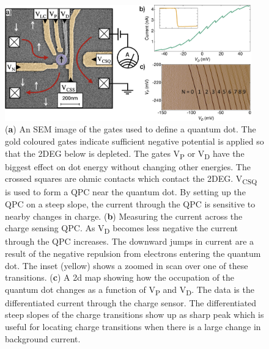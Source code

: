 \begin{figure}[!htb]
  \begin{center}
    \includegraphics[width=0.95\textwidth]{figures/ch1/crop_FiguresMaster.006.png}
    \caption[Charge sensing a quantum dot]{\label{fig:ch1/ct_intro} 
    (\textbf{a}) An SEM image of the gates used to define a quantum dot. The gold coloured gates indicate sufficient negative potential is applied so that the 2DEG below is depleted. The gates V\textsubscript{P} or V\textsubscript{D} have the biggest effect on dot energy without changing other energies. The crossed squares are ohmic contacts which contact the 2DEG. V\textsubscript{CSQ} is used to form a QPC near the quantum dot. By setting up the QPC on a steep slope, the current through the QPC is sensitive to nearby changes in charge. (\textbf{b}) Measuring the current across the charge sensing QPC. As V\textsubscript{D} becomes less negative the current through the QPC increases. The downward jumps in current are a result of the negative repulsion from electrons entering the quantum dot. The inset (yellow) shows a zoomed in scan over one of these transitions. (\textbf{c}) A 2d map showing how the occupation of the quantum dot changes as a function of V\textsubscript{P} and V\textsubscript{D}. The data is the differentiated current through the charge sensor. The differentiated steep slopes of the charge transitions show up as sharp peak which is useful for locating charge transitions when there is a large change in background current. 
      }
  \end{center}
\end{figure}


